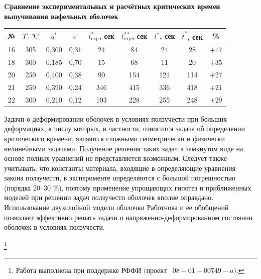 \begin{table}[h!] \small \vspace{-2mm}
\centering 
{\bf Cравнение экспериментальных и расчётных критических времен\\
выпучивания вафельных оболочек} \vspace{-1mm}
\begin{tabular}{c|c|c|c|c|c|c|c|c}       \hline
№ & $\mbox{$T$,~\textcelsius}$ & $q^\ast$ & $\sigma$ & $t^\ast_{\exp}$, сек &
$t^{\ast\ast}_{\exp}$, сек & $t^\ast$, сек \cite{Poshivalov:Posh1}& $\hat{t}^\ast $, сек  &
\%
 \\ \hline
16 & 305 & 0,300 & 0,31 & 24 & 84 & 24 & 28 & $+17$\\
18 & 300 & 0,185 & 0,70 & 15 & 68 & 11 & 20 & $+35$\\
20 & 250 & 0,400 & 0,38 & 90 & 154 & 121 & 114 & $+27$\\
21 & 250 & 0,390 & 0,24 & 346 & 415 & 336 & 418 & $+21$\\
22 & 300 & 0,210 & 0,12 & 193 & 228 & 255 & 248 & $+29$\\
\hline
\end{tabular} \vspace{-2mm}
\end{table}

 Задачи о деформировании оболочек в условиях ползучести при
больших деформациях, к числу которых, в частности, относится задача об определении
критического времени, являются сложными геометрически и физически нелинейными задачами.
Получение решения таких задач в замкнутом виде на основе полных уравнений не
представляется возможным. Следует также учитывать, что константы материала, входящие в
определяющие уравнения закона ползучести, в эксперименте определяются с большой
погрешностью (порядка 20--30 \%), поэтому применение упрощающих гипотез и приближенных
моделей при решении задач ползучести оболочек вполне оправдано. Использование двухслойной
модели оболочки Работнова и ее обобщений позволяет эффективно решать задачи о
напряженно-деформированном состоянии оболочек в условиях ползучести.


{\thanks{Работа выполнена при поддержке РФФИ $($проект \rm \No~$08{-}01{-}00749{-}a).$}}



